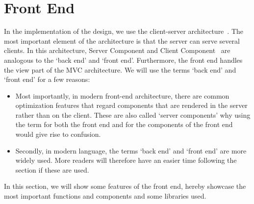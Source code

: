 \section{Front End}\label{sec:front-end}

In the implementation of the design, we use the client-server architecture~\cite{mathiassen2018}.
The most important element of the architecture is that the server can serve several clients.
In this architecture, Server Component and Client Component~\cite{mathiassen2018} are analogous to the `back end' and
`front end'.
Furthermore, the front end handles the view part of the MVC architecture.
We will use the terms `back end' and `front end' for a few reasons:

\begin{itemize}
    \item Most importantly, in modern front-end architecture, there are common optimization features that regard
    components that are rendered in the server rather than on the client.
    These are also called `server components' why using the term for both the front end and for the components of the
    front end would give rise to confusion.

    \item Secondly, in modern language, the terms `back end' and `front end' are more widely used.
    More readers will therefore have an easier time following the section if these are used.
\end{itemize}

In this section, we will show some features of the front end, hereby showcase the most important functions and
components and some libraries used.





